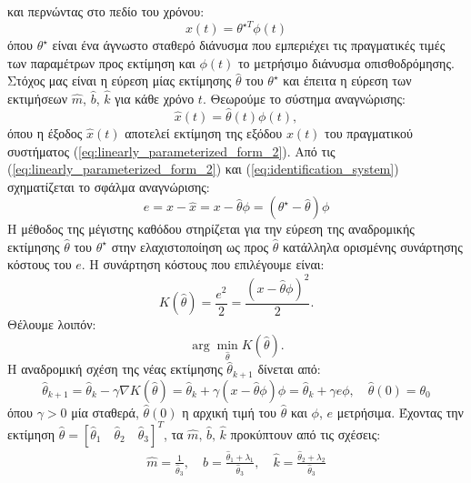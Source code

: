 \documentclass[a4paper,12pt]{article}
\begin{document}
και περνώντας στο πεδίο του χρόνου:
\begin{equation}
    x(t) = \theta^{\star T}\phi(t)
    \label{eq:linearly_parameterized_form_2}
\end{equation}
όπου $\theta^{\star}$ είναι ένα άγνωστο σταθερό διάνυσμα που εμπεριέχει τις πραγματικές τιμές των παραμέτρων 
προς εκτίμηση και $\phi(t)$ το μετρήσιμο διάνυσμα οπισθοδρόμησης. Στόχος μας είναι η εύρεση μίας 
εκτίμησης $\hat{\theta}$ του $\theta^{\star}$ και έπειτα η εύρεση των εκτιμήσεων $\hat{m}$, $\hat{b}$, 
$\hat{k}$ για κάθε χρόνο $t$. Θεωρούμε το σύστημα αναγνώρισης:
\begin{equation}
    \hat{x}(t) = \hat{\theta}(t)\phi(t),
    \label{eq:identification_system}
\end{equation}
όπου η έξοδος $\hat{x}(t)$ αποτελεί εκτίμηση της εξόδου $x(t)$ του πραγματικού συστήματος 
(\ref{eq:linearly_parameterized_form_2}). Από τις (\ref{eq:linearly_parameterized_form_2}) και 
(\ref{eq:identification_system}) σχηματίζεται το σφάλμα αναγνώρισης:
\begin{equation}
    e = x - \hat{x} = x - \hat{\theta} \phi = (\theta^{\star} - \hat{\theta}) \phi
    \label{eq:identification_error}
\end{equation}
Η μέθοδος της μέγιστης καθόδου στηρίζεται για την εύρεση της αναδρομικής εκτίμησης $\hat{\theta}$ του 
$\theta^{\star}$ στην ελαχιστοποίηση ως προς $\hat{\theta}$ κατάλληλα ορισμένης συνάρτησης κόστους του $e$.
Η συνάρτηση κόστους που επιλέγουμε είναι:
\begin{equation}
    K(\hat{\theta}) = \frac{e^2}{2} = \frac{(x - \hat{\theta}\phi)^2}{2}.
    \label{eq:cost_function}
\end{equation}
Θέλουμε λοιπόν:
\begin{equation*}
    \arg \min_{\hat{\theta}} K(\hat{\theta}).
\end{equation*}
Η αναδρομική σχέση της νέας εκτίμησης $\hat{\theta}_{k+1}$ δίνεται από:
\begin{equation}
    \hat{\theta}_{k+1} = \hat{\theta}_k -\gamma \nabla K(\hat{\theta}) = 
    \hat{\theta}_k + \gamma(x - \hat{\theta}\phi)\phi = \hat{\theta}_k + \gamma e \phi,
    \quad \hat{\theta}(0) = \theta_0
    \label{eq:gradient_descend}
\end{equation}
όπου $\gamma > 0$ μία σταθερά, $\hat{\theta}(0)$ η αρχική τιμή του $\hat{\theta}$ και $\phi$, $e$ μετρήσιμα.
Έχοντας την εκτίμηση $\hat{\theta} = [\hat{\theta}_1\quad\hat{\theta}_2 \quad \hat{\theta}_3]^T$, τα
$\hat{m}, \, \hat{b}, \, \hat{k}$ προκύπτουν από τις σχέσεις:
\begin{equation*}
    \begin{aligned}
        \hat{m} = \frac{1}{\hat{\theta}_3}, \quad
        \hat{b} = \frac{\hat{\theta}_1 + \lambda_1}{\hat{\theta}_3}, \quad
        \hat{k} = \frac{\hat{\theta}_2 + \lambda_2}{\hat{\theta}_3}
    \end{aligned}
\end{equation*}
\end{document}
